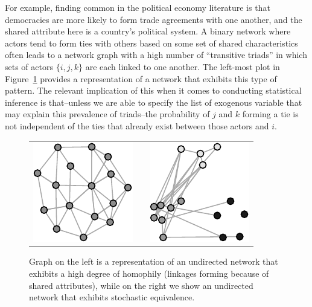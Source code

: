 \documentclass[12pt,pdflatex]{elsarticle}
\begin{document}
For example, finding common in the political economy literature is that democracies are more likely to form trade agreements with one another, and the shared attribute here is a country's political system. A binary network where actors tend to form ties with others based on some set of shared characteristics often leads to a network graph with a high number of ``transitive triads'' in which  sets of actors $\{i,j,k\}$ are each linked to one another. The left-most plot in Figure~\ref{fig:homphStochEquivNet} provides a representation of a network that exhibits this type of pattern. The relevant implication of this when it comes to conducting statistical inference is that--unless we are able to specify the list of exogenous variable that may explain this prevalence of triads--the probability of $j$ and $k$ forming a tie is not independent of the ties that already exist between those actors and $i$.

\begin{figure}[ht]
	\centering
	\caption{Graph on the left is a representation of an undirected network that exhibits a high degree of homophily (linkages forming because of shared attributes), while on the right we show an undirected network that exhibits stochastic equivalence.}	
	\begin{tabular}{lcr}
	\includegraphics[width=.33\textwidth]{homophNet} & \hspace{2cm} &
	\includegraphics[width=.33\textwidth]{stochEquivNet}	
	\end{tabular}
	\label{fig:homphStochEquivNet}
\end{figure}
\end{document}
